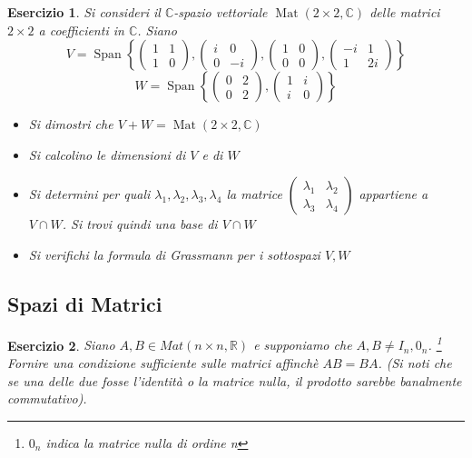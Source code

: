 \documentclass{article}
\newtheorem{es}{Esercizio}
\begin{document}
{\begin{es}
    Si consideri il $\mathbb{C}$-spazio vettoriale $\operatorname{Mat}(2\times 2,\mathbb{C})$ delle matrici $2\times 2$ a coefficienti in $\mathbb{C}$. Siano $$V=\operatorname{Span}\left\{ \begin{pmatrix}
        1 & 1\\
        1 & 0
    \end{pmatrix},\begin{pmatrix}
        i & 0\\
        0 & -i
    \end{pmatrix},\begin{pmatrix}
        1 & 0\\
        0 & 0
    \end{pmatrix},\begin{pmatrix}
        -i & 1\\
        1 & 2i
    \end{pmatrix}\right\} $$
    $$W=\operatorname{Span}\left\{ \begin{pmatrix}
        0 & 2\\
        0 & 2
    \end{pmatrix},\begin{pmatrix}
        1 & i\\
        i & 0
    \end{pmatrix}\right\} $$
    \begin{itemize}
        \item Si dimostri che $V+W =\operatorname{Mat}(2\times 2,\mathbb{C})$
        \item Si calcolino le dimensioni di $V$ e di $W$
        \item Si determini per quali $\lambda_1,\lambda_2,\lambda_3,\lambda_4$ la matrice $\begin{pmatrix}
            \lambda_1 & \lambda_2 \\
            \lambda_3 & \lambda_4
        \end{pmatrix}$ appartiene a $V\cap W$. Si trovi quindi una base di $V\cap W$
        \item Si verifichi la formula di Grassmann per i sottospazi $V,W$
    \end{itemize}
\end{es}





\subsection{Spazi di Matrici}
\begin{es}
    Siano $A,B\in Mat(n \times n, \mathbb{R})$ e  supponiamo che $A,B\neq I_n,0_n$. \footnote{$0_n$ indica la matrice nulla di ordine n} \\Fornire una condizione sufficiente sulle matrici affinchè $AB=BA$.
    (Si noti che se una delle due fosse l'identità o la matrice nulla, il prodotto sarebbe banalmente commutativo).
\end{es}

}
\end{document}
